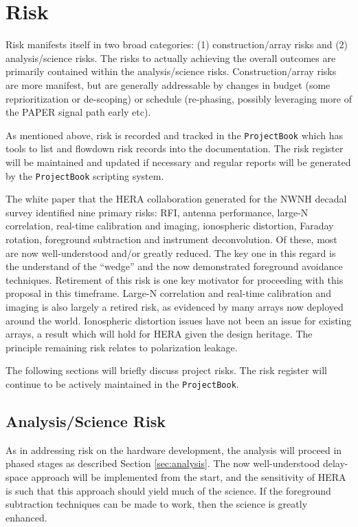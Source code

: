 \documentclass[preprint]{aastex}
\begin{document}
\section{Risk}
\label{sec:risk}
Risk manifests itself in two broad categories: (1) construction/array risks and (2)
analysis/science risks. The risks to actually achieving the overall outcomes are
primarily contained within the analysis/science risks. Construction/array risks are
more manifest, but are generally addressable by changes in budget (some
reprioritization or de-scoping) or schedule (re-phasing, possibly leveraging more of
the PAPER signal path early etc).

As mentioned above, risk is recorded and tracked in the {\tt ProjectBook} which has tools 
to list and flowdown risk records into the documentation.  The risk register will be 
maintained and updated if necessary and regular reports will be generated by the
{\tt ProjectBook} scripting system.

The white paper that the HERA collaboration generated for the NWNH decadal survey identified nine
primary risks:  RFI, antenna performance, large-N correlation, real-time calibration and imaging, 
ionospheric distortion, Faraday rotation, foreground subtraction and instrument deconvolution.
Of these, most are now well-understood and/or greatly reduced.  The key one in this regard is
the understand of the ``wedge'' and the now demonstrated foreground avoidance techniques.
Retirement of this risk is one key motivator for proceeding with this proposal in this
timeframe.  Large-N correlation and real-time calibration and imaging is also largely a
retired risk, as evidenced by many arrays now deployed around the world.  Ionospheric
distortion issues have not been an issue for existing arrays, a result which will hold for
HERA given the design heritage.  The principle remaining risk relates to polarization leakage.

The following sections will briefly discuss project risks.  The risk register will continue to be
actively maintained in the {\tt ProjectBook}.

\subsection{Analysis/Science Risk}
As in addressing risk on the hardware development, the analysis will proceed in
phased stages as described Section \ref{sec:analysis}. The now well-understood
delay-space approach will be implemented from the start, and the sensitivity of HERA
is such that this approach should yield much of the science. If the foreground
subtraction techniques can be made to work, then the science is greatly enhanced.
\end{document}
